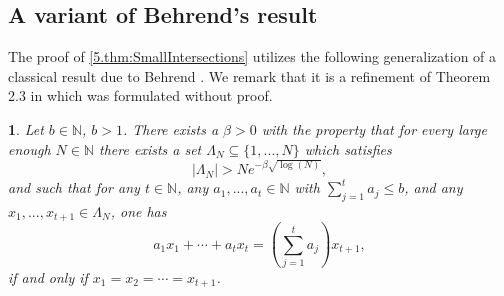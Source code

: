 \documentclass[11pt,american,preprint]{elsarticle}
\numberwithin{equation}{section}
\theoremstyle{plain}
\theoremstyle{plain*}
\theoremstyle{plain}
\newtheorem{lem}[thm]{\protect\lemmaname}
\theoremstyle{plain*}
\theoremstyle{plain}
\theoremstyle{plain*}
\theoremstyle{remark}
\theoremstyle{remark*}
\theoremstyle{remark}
\theoremstyle{remark*}
\theoremstyle{remark}
\theoremstyle{remark*}
\theoremstyle{plain}
\theoremstyle{definition}
\theoremstyle{plain}
\theoremstyle{plain} %
\providecommand{\lemmaname}{Lemma}
\newcommand{\N}{\mathbb{N}}
\begin{document}
\subsection{A variant of Behrend's result}
The proof of \cref{5.thm:SmallIntersections} utilizes the following  generalization of a classical result due to  Behrend \cite{BehrendSetsWithNo3-APs}. We remark that it is a refinement of Theorem 2.3 in \cite{Ruzsa93LinearEquations} which was formulated without proof.
\begin{lem}\label{10'.lem:Rusza(d-1)}
Let $b\in\N$, $b>1$. There exists a $\beta>0$ with the property that for every  large enough $N\in\N$ there exists a set 
$\Lambda_N\subseteq \{1,...,N\}$ 
which satisfies 
\begin{equation}\label{eq:Lambda_NLowerBound}
    |\Lambda_N|>Ne^{-\beta \sqrt{\log(N)}},
\end{equation}
and such  that for any $t\in\N$, any $a_1,...,a_t\in\N$ with $\sum_{j=1}^ta_j\leq b$, and any $x_1,...,x_{t+1}\in \Lambda_N$, one has 
\begin{equation}\label{eq:equationsOfanyLength}
a_1x_1+\cdots+a_tx_t=(\sum_{j=1}^ta_j)x_{t+1},
\end{equation}
if and only if $x_1=x_2=\cdots=x_{t+1}$. 
\end{lem}
\end{document}
